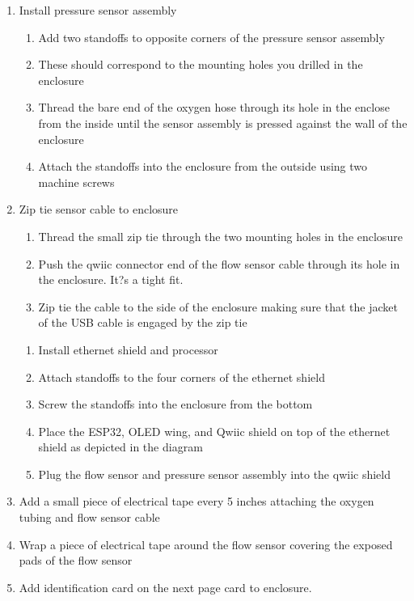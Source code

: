 \documentclass[11pt, letterpaper]{article}
\begin{document}
\begin{enumerate}
\begin{enumerate}[label=5.\arabic*]
\item
Install pressure sensor assembly
\begin{enumerate}[label=5.2.\arabic*]
\item
Add two standoffs to opposite corners of the pressure sensor assembly
\item
These should correspond to the mounting holes you drilled in the enclosure
\item
Thread the bare end of the oxygen hose through its hole in the enclose from the inside until the sensor assembly is pressed against the wall of the  enclosure
\item
Attach the standoffs into the enclosure from the outside using two machine screws
\end{enumerate}
\item
Zip tie sensor cable to enclosure
\begin{enumerate}[label=5.3.\arabic*]
\item
Thread the small zip tie through the two mounting holes in the enclosure
\item
Push the qwiic connector end of the flow sensor cable through its hole in the enclosure. It?s a tight fit.
\item
Zip tie the cable to the side of the enclosure making sure that the jacket of the USB cable is engaged by the zip tie
\end{enumerate}
\begin{enumerate}[label=5.4.\arabic*]
\item
Install ethernet shield and processor
\item
Attach standoffs to the four corners of the ethernet shield
\item
Screw the standoffs into the enclosure from the bottom
\item
Place the ESP32, OLED wing, and Qwiic shield on top of the ethernet shield as depicted in the diagram
\item
Plug the flow sensor and pressure sensor assembly into the qwiic shield
\end{enumerate}
\item
Add a small piece of electrical tape every 5 inches attaching the oxygen tubing and flow sensor cable
\item
Wrap a piece of electrical tape around the flow sensor covering the exposed pads of the flow sensor
\item
Add identification card on the next page card to enclosure.

\end{enumerate}

\end{enumerate}
\end{document}
